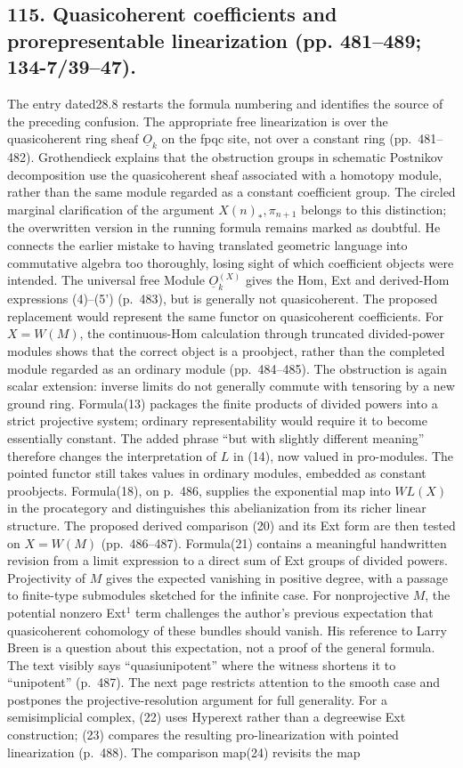 \documentclass[10pt,oneside]{book}
\begin{document}
\subsection*{115. Quasicoherent coefficients and prorepresentable linearization (pp. 481--489; 134-7/39--47).}
The entry dated28.8 restarts the formula numbering and identifies the source of the preceding confusion. The appropriate free linearization is over the quasicoherent ring sheaf $\underline O_k$ on the fpqc site, not over a constant ring (pp.~481--482). Grothendieck explains that the obstruction groups in schematic Postnikov decomposition use the quasicoherent sheaf associated with a homotopy module, rather than the same module regarded as a constant coefficient group. The circled marginal clarification of the argument $X(n)_*,\pi_{n+1}$ belongs to this distinction; the overwritten version in the running formula remains marked as doubtful. He connects the earlier mistake to having translated geometric language into commutative algebra too thoroughly, losing sight of which coefficient objects were intended. The universal free Module $\underline O_k^{(X)}$ gives the Hom, Ext and derived-Hom expressions (4)--(5') (p.~483), but is generally not quasicoherent. The proposed replacement would represent the same functor on quasicoherent coefficients. For $X=W(M)$, the continuous-Hom calculation through truncated divided-power modules shows that the correct object is a proobject, rather than the completed module regarded as an ordinary module (pp.~484--485). The obstruction is again scalar extension: inverse limits do not generally commute with tensoring by a new ground ring. Formula(13) packages the finite products of divided powers into a strict projective system; ordinary representability would require it to become essentially constant. The added phrase ``but with slightly different meaning'' therefore changes the interpretation of $L$ in (14), now valued in pro-modules. The pointed functor still takes values in ordinary modules, embedded as constant proobjects. Formula(18), on p.~486, supplies the exponential map into $WL(X)$ in the procategory and distinguishes this abelianization from its richer linear structure. The proposed derived comparison (20) and its Ext form are then tested on $X=W(M)$ (pp.~486--487). Formula(21) contains a meaningful handwritten revision from a limit expression to a direct sum of Ext groups of divided powers. Projectivity of $M$ gives the expected vanishing in positive degree, with a passage to finite-type submodules sketched for the infinite case. For nonprojective $M$, the potential nonzero Ext$^1$ term challenges the author's previous expectation that quasicoherent cohomology of these bundles should vanish. His reference to Larry Breen is a question about this expectation, not a proof of the general formula. The text visibly says ``quasiunipotent'' where the witness shortens it to ``unipotent'' (p.~487). The next page restricts attention to the smooth case and postpones the projective-resolution argument for full generality. For a semisimplicial complex, (22) uses Hyperext rather than a degreewise Ext construction; (23) compares the resulting pro-linearization with pointed linearization (p.~488). The comparison map(24) revisits the map 
\end{document}
